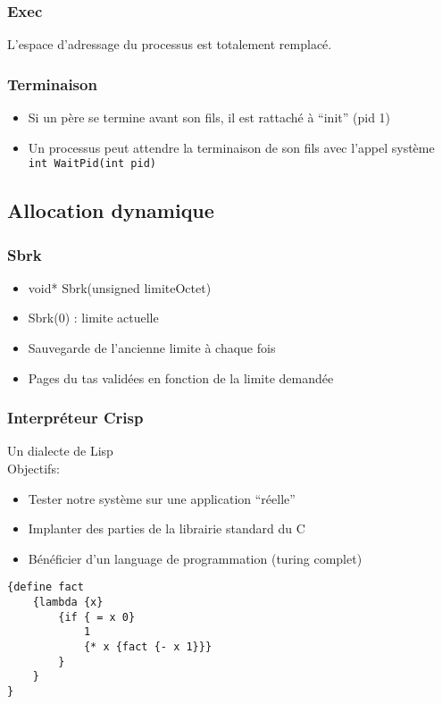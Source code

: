 \documentclass{beamer}
\begin{document}
\begin{frame}
  \frametitle{Exec}
  L'espace d'adressage du processus est totalement remplacé.
\end{frame}

\begin{frame}
  \frametitle{Terminaison}
  \begin{itemize}
    \item Si un père se termine avant son fils, il est rattaché à ``init'' (pid 1)
    \item Un processus peut attendre la terminaison de son fils avec l'appel système \texttt{int WaitPid(int pid)}
  \end{itemize}

\end{frame}


\subsection{Allocation dynamique}
\begin{frame}
\frametitle{Sbrk}
  \begin{itemize}
  \item void* Sbrk(unsigned limiteOctet)
  \item Sbrk(0) : limite actuelle
  \item Sauvegarde de l'ancienne limite à chaque fois
  \item Pages du tas validées en fonction de la limite demandée
  \end{itemize}
\end{frame}

\begin{frame}[fragile]
  \frametitle{Interpréteur Crisp}
  Un dialecte de Lisp\\
  Objectifs:
  \begin{itemize}
  \item Tester notre système sur une application ``réelle''
  \item Implanter des parties de la librairie standard du C
  \item Bénéficier d'un language de programmation (turing complet)
  \end{itemize}

  {\scriptsize
\begin{verbatim}
{define fact
    {lambda {x}
        {if { = x 0}
            1
            {* x {fact {- x 1}}}
        }
    }
}
\end{verbatim}
}
\end{frame}
\end{document}
